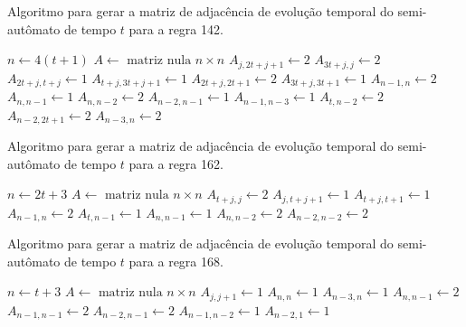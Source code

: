 \documentclass[12pt,a4paper]{article}
\begin{document}
\begin{algorithm}[H]
\caption{Algoritmo para gerar a matriz de adjacência de evolução temporal do
semi-autômato de tempo $t$ para a regra 142.}
\label{alg:r142}
\begin{algorithmic}
\STATE $n \leftarrow 4(t+1)$
\STATE $A \leftarrow \mbox{ matriz nula } n \times n$
        \STATE $A_{j,2t+j+1} \leftarrow 2$
    \ENDFOR
\ENDIF
{}
    \STATE $A_{3t+j,j} \leftarrow 2$
    \STATE $A_{2t+j,t+j} \leftarrow 1$
    \STATE $A_{t+j,3t+j+1} \leftarrow 1$
    \STATE $A_{2t+j,2t+1} \leftarrow 2$
\ENDFOR
{}
    \STATE $A_{3t+j,3t+1} \leftarrow 1$
\ENDFOR
\STATE $A_{n-1,n} \leftarrow 2$
\STATE $A_{n,n-1} \leftarrow 1$
\STATE $A_{n,n-2} \leftarrow 2$
\STATE $A_{n-2,n-1} \leftarrow 1$
\STATE $A_{n-1,n-3} \leftarrow 1$
\STATE $A_{t,n-2} \leftarrow 2$
\STATE $A_{n-2,2t+1} \leftarrow 2$
\STATE $A_{n-3,n} \leftarrow 2$
\end{algorithmic}
\end{algorithm}

\begin{algorithm}[H]
\caption{Algoritmo para gerar a matriz de adjacência de evolução temporal do
semi-autômato de tempo $t$ para a regra 162.}
\label{alg:r162}
\begin{algorithmic}
\STATE $n \leftarrow 2t+3$
\STATE $A \leftarrow \mbox{ matriz nula } n \times n$
    \STATE $A_{t+j,j} \leftarrow 2$
\ENDFOR
{}
        \STATE $A_{j,t+j+1} \leftarrow 1$
    \ENDFOR
\ENDIF
{}
    \STATE $A_{t+j,t+1} \leftarrow 1$
\ENDFOR
\STATE $A_{n-1,n} \leftarrow 2$
\STATE $A_{t,n-1} \leftarrow 1$
\STATE $A_{n,n-1} \leftarrow 1$
\STATE $A_{n,n-2} \leftarrow 2$
\STATE $A_{n-2,n-2} \leftarrow 2$
\end{algorithmic}
\end{algorithm}

\begin{algorithm}[H]
\caption{Algoritmo para gerar a matriz de adjacência de evolução temporal do
semi-autômato de tempo $t$ para a regra 168.}
\label{alg:r168}
\begin{algorithmic}
\STATE $n \leftarrow t+3$
\STATE $A \leftarrow \mbox{ matriz nula } n \times n$
        \STATE $A_{j,j+1} \leftarrow 1$
    \ENDFOR
\ENDIF
\STATE $A_{n,n} \leftarrow 1$
\STATE $A_{n-3,n} \leftarrow 1$
\STATE $A_{n,n-1} \leftarrow 2$
\STATE $A_{n-1,n-1} \leftarrow 2$
\STATE $A_{n-2,n-1} \leftarrow 2$
\STATE $A_{n-1,n-2} \leftarrow 1$
\STATE $A_{n-2,1} \leftarrow 1$
\end{algorithmic}
\end{algorithm}
\end{document}
